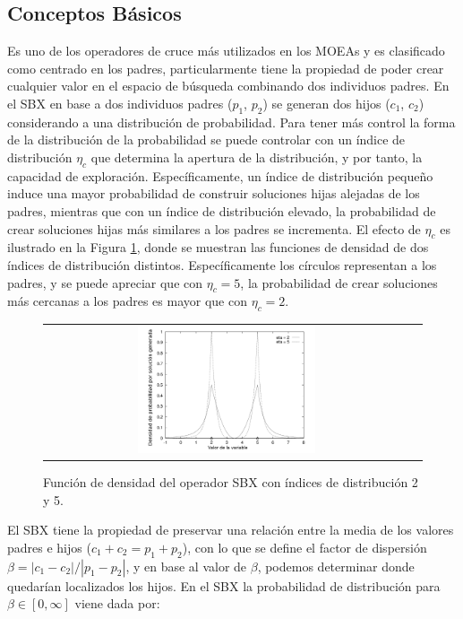 \subsection{Conceptos Básicos}
Es uno de los operadores de cruce más utilizados en los MOEAs y es clasificado como centrado en los padres, 
particularmente tiene la propiedad de poder crear cualquier valor en el espacio de búsqueda combinando dos individuos padres.
%
En el SBX en base a dos individuos padres ($p_1$, $p_2$) se generan dos hijos ($c_1$, $c_2$) considerando 
a una distribución de probabilidad.
%
Para tener más control la forma de la distribución de la probabilidad se puede controlar con un índice de distribución 
$\eta_c$ que determina la apertura de la distribución, y por tanto, la capacidad de exploración.
%
Específicamente, un índice de distribución pequeño induce una mayor probabilidad de construir soluciones hijas alejadas de los padres, mientras que con un índice de distribución elevado, la probabilidad de crear soluciones hijas más similares a los padres se incrementa. 
%
El efecto de $\eta_c$ es ilustrado en la Figura \ref{fig:Density_SBX}, donde se muestran las funciones de densidad de dos índices 
de distribución distintos.
%
Específicamente los círculos representan a los padres, y se puede apreciar que con $\eta_c=5$, la probabilidad de crear soluciones 
más cercanas a los padres es mayor que con $\eta_c=2$.
\begin{figure}[!t]%
\centering
\begin{tabular}{cc}
   \includegraphics[width=0.5\textwidth]{img/Operadores/DensitySBX.png} &
\end{tabular}
\caption{Función de densidad del operador SBX con índices de distribución 2 y 5.}
\label{fig:Density_SBX}
\end{figure}


El SBX tiene la propiedad de preservar una relación entre la media de los valores padres e hijos ($c_1 + c_2 = p_1 + p_2$), 
con lo que se define el factor de dispersión $\beta = | c_1 - c_2| / |p_1 - p_2|$, y en base al valor de $\beta$, podemos
determinar donde quedarían localizados los hijos.
%
En el SBX la probabilidad de distribución para $\beta \in [0, \infty]$ viene dada por:

